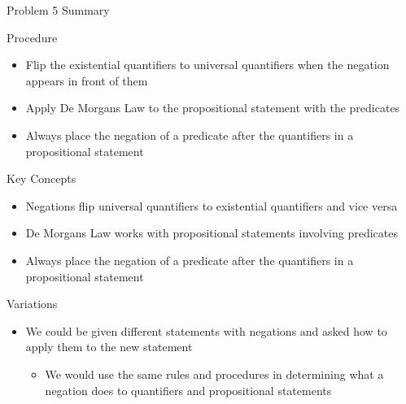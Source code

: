 \begin{summary}{Problem 5 Summary}
\begin{statement}{Procedure}
\begin{enumerate}[label = (\alph*)]
\begin{itemize}
                \item Flip the existential quantifiers to universal quantifiers when the negation appears in front of them
                \item Apply De Morgans Law to the propositional statement with the predicates
                \item Always place the negation of a predicate after the quantifiers in a propositional statement
            \end{itemize}
        \end{enumerate}
    \end{statement}
    \begin{statement}{Key Concepts}
        \begin{itemize}
            \item Negations flip universal quantifiers to existential quantifiers and vice versa
            \item De Morgans Law works with propositional statements involving predicates
            \item Always place the negation of a predicate after the quantifiers in a propositional statement
        \end{itemize}
    \end{statement}
    \begin{statement}{Variations}
        \begin{itemize}
            \item We could be given different statements with negations and asked how to apply them to the new statement
            \begin{itemize}
                \item We would use the same rules and procedures in determining what a negation does to quantifiers and propositional statements
            \end{itemize}
        \end{itemize}
    \end{statement}
\end{summary}

